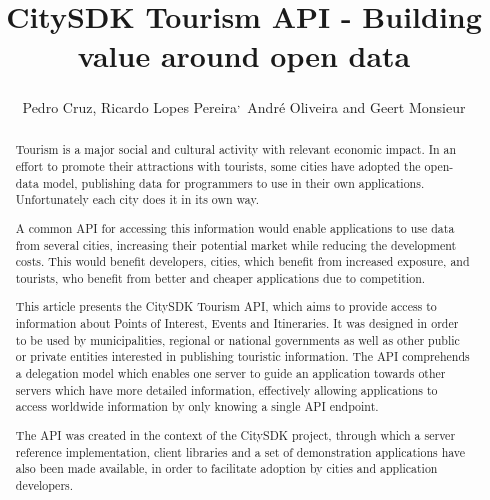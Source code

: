 \documentclass[times]{ettauth}
\begin{document}




\title{CitySDK Tourism API - Building value around open data}
\author{Pedro Cruz,
Ricardo Lopes Pereira\textsuperscript{,}\corrauth\,
Andr\'e Oliveira and 
Geert Monsieur}
\address{
 Instituto Superior T\'ecnico, Avenida Rovisco Pais 1, 1049-001 Lisboa, Portugal\\
 INESC-ID, Av. Prof. Dr. Cavaco Silva, 2744-016 Porto Salvo, Portugal\\
 ISA - Intelligent Sensing Anywhere S.A, Rua D. Manuel I, 30, 3030-320 Coimbra, Portugal\\
 European Research Institute in Service Science (ERISS), Tilburg University, Warandelaan 2, 5037AB Tilburg, The Netherlands
}

\begin{abstract}
Tourism is a major social and cultural activity with relevant economic impact.
In an effort to promote their attractions with tourists, some cities have adopted the open-data model, publishing data for programmers to use in their own applications.
Unfortunately each city does it in its own way.

A common API for accessing this information would enable applications to use data from several cities, increasing their potential market while reducing the development costs.
This would benefit developers, cities, which benefit from increased exposure, and tourists, who benefit from better and cheaper applications due to competition.

This article presents the CitySDK Tourism API, which aims to provide access to information about Points of Interest, Events and Itineraries.
It was designed in order to be used by municipalities, regional or national governments as well as other public or private entities interested in publishing touristic information.
The API comprehends a delegation model which enables one server to guide an application towards other servers which have more detailed information, effectively allowing applications to access worldwide information by only knowing a single API endpoint.

The API was created in the context of the CitySDK project, through which a server reference implementation, client libraries and a set of demonstration applications have also been made available, in order to facilitate adoption by cities and application developers.

\end{abstract}
\end{document}
